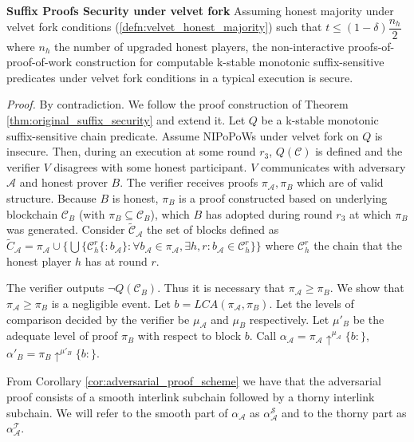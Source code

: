 \begin{thm}{\textbf{Suffix Proofs Security under velvet fork}}
	Assuming honest majority under velvet fork conditions (\ref{defn:velvet_honest_majority}) such that $t \leq (1 - \delta) \dfrac{n_h}{2}$ where $n_h$ the number of upgraded honest players, the non-interactive proofs-of-proof-of-work construction for computable k-stable monotonic suffix-sensitive predicates under velvet fork conditions in a typical execution is secure.
\end{thm}
\textit{Proof.} By contradiction. We follow the proof construction of Theorem \ref{thm:original_suffix_security} 
and extend it. Let $Q$ be a k-stable monotonic suffix-sensitive chain
predicate. Assume NIPoPoWs under velvet fork on $Q$ is insecure. Then, during
an execution at some round  $r_3$, $Q(\mathcal{C})$ is defined and the verifier $V$
disagrees with some honest participant. $V$
communicates with adversary $\mathcal{A}$ and honest prover $B$. The verifier receives
proofs $\pi_\mathcal{A}, \pi_B$ which are of valid structure. Because $B$ is honest, $\pi_B$ is a proof constructed
based on underlying blockchain $\mathcal{C}_B$ (with $\pi_B \subseteq \mathcal{C}_B$), which $B$
has adopted during round $r_3$ at which $\pi_B$ was generated. Consider
$\widetilde{\mathcal{C}}_\mathcal{A}$ the set of blocks defined as
$\widetilde{C}_\mathcal{A} = \pi_\mathcal{A} \cup \{ \bigcup \{\mathcal{C}_h^r\{:b_\mathcal{A}\}:  \forall b_\mathcal{A} \in \pi_\mathcal{A}, \exists h,r : b_\mathcal{A} \in 
\mathcal{C}_{h}^{r}\}  \}$ where $\mathcal{C}_h^r$ the chain 
 that the honest player $h$ has at round $r$.

The verifier outputs $\neg Q(\mathcal{C}_B)$. Thus it is necessary that $\pi_\mathcal{A} \geq \pi_B$.
We show that $\pi_\mathcal{A} \geq \pi_B$ is a negligible event.
Let $b = LCA(\pi_\mathcal{A}, \pi_B)$. Let the levels of comparison decided by the verifier
be $\mu_\mathcal{A}$ and $\mu_B$ respectively. Let $\mu'_B$ be the adequate level of proof
$\pi_B$  with respect to block $b$. Call $\alpha_\mathcal{A} = \pi_\mathcal{A} \uparrow^{\mu_\mathcal{A}}\{b:\}$,
$\alpha'_B = \pi_B \uparrow^{\mu'_B}\{b:\}$.

From Corollary \ref{cor:adversarial_proof_scheme} we have that the adversarial proof 
consists of a smooth interlink subchain followed by a thorny interlink subchain. We will refer to the smooth part of $\alpha_\mathcal{A}$ as $\alpha^{\mathcal{S}}_\mathcal{A}$ and to the thorny part as $\alpha^{\mathcal{T}}_\mathcal{A}$.   

